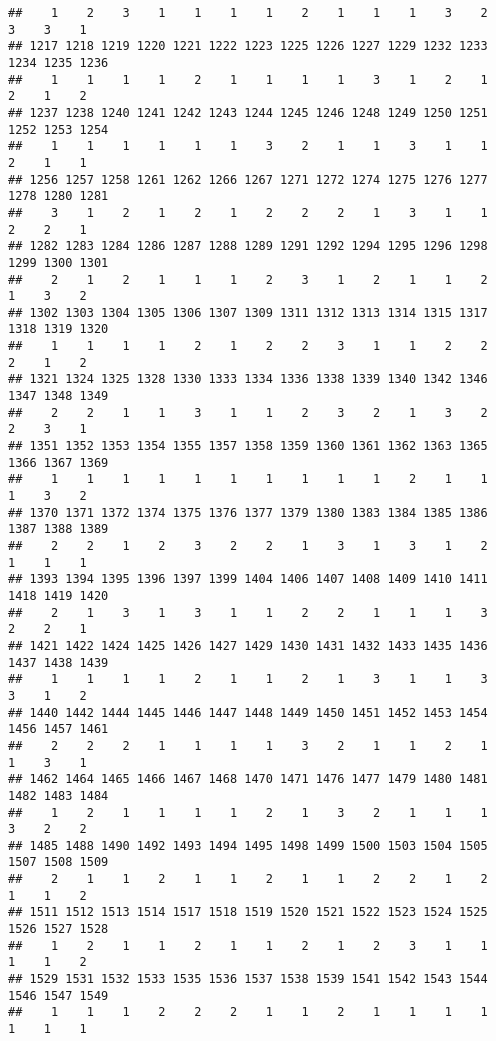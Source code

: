 \documentclass[
]{article}
\begin{document}
\begin{verbatim}
##    1    2    3    1    1    1    1    2    1    1    1    3    2    3    3    1 
## 1217 1218 1219 1220 1221 1222 1223 1225 1226 1227 1229 1232 1233 1234 1235 1236 
##    1    1    1    1    2    1    1    1    1    3    1    2    1    2    1    2 
## 1237 1238 1240 1241 1242 1243 1244 1245 1246 1248 1249 1250 1251 1252 1253 1254 
##    1    1    1    1    1    1    3    2    1    1    3    1    1    2    1    1 
## 1256 1257 1258 1261 1262 1266 1267 1271 1272 1274 1275 1276 1277 1278 1280 1281 
##    3    1    2    1    2    1    2    2    2    1    3    1    1    2    2    1 
## 1282 1283 1284 1286 1287 1288 1289 1291 1292 1294 1295 1296 1298 1299 1300 1301 
##    2    1    2    1    1    1    2    3    1    2    1    1    2    1    3    2 
## 1302 1303 1304 1305 1306 1307 1309 1311 1312 1313 1314 1315 1317 1318 1319 1320 
##    1    1    1    1    2    1    2    2    3    1    1    2    2    2    1    2 
## 1321 1324 1325 1328 1330 1333 1334 1336 1338 1339 1340 1342 1346 1347 1348 1349 
##    2    2    1    1    3    1    1    2    3    2    1    3    2    2    3    1 
## 1351 1352 1353 1354 1355 1357 1358 1359 1360 1361 1362 1363 1365 1366 1367 1369 
##    1    1    1    1    1    1    1    1    1    1    2    1    1    1    3    2 
## 1370 1371 1372 1374 1375 1376 1377 1379 1380 1383 1384 1385 1386 1387 1388 1389 
##    2    2    1    2    3    2    2    1    3    1    3    1    2    1    1    1 
## 1393 1394 1395 1396 1397 1399 1404 1406 1407 1408 1409 1410 1411 1418 1419 1420 
##    2    1    3    1    3    1    1    2    2    1    1    1    3    2    2    1 
## 1421 1422 1424 1425 1426 1427 1429 1430 1431 1432 1433 1435 1436 1437 1438 1439 
##    1    1    1    1    2    1    1    2    1    3    1    1    3    3    1    2 
## 1440 1442 1444 1445 1446 1447 1448 1449 1450 1451 1452 1453 1454 1456 1457 1461 
##    2    2    2    1    1    1    1    3    2    1    1    2    1    1    3    1 
## 1462 1464 1465 1466 1467 1468 1470 1471 1476 1477 1479 1480 1481 1482 1483 1484 
##    1    2    1    1    1    1    2    1    3    2    1    1    1    3    2    2 
## 1485 1488 1490 1492 1493 1494 1495 1498 1499 1500 1503 1504 1505 1507 1508 1509 
##    2    1    1    2    1    1    2    1    1    2    2    1    2    1    1    2 
## 1511 1512 1513 1514 1517 1518 1519 1520 1521 1522 1523 1524 1525 1526 1527 1528 
##    1    2    1    1    2    1    1    2    1    2    3    1    1    1    1    2 
## 1529 1531 1532 1533 1535 1536 1537 1538 1539 1541 1542 1543 1544 1546 1547 1549 
##    1    1    1    2    2    2    1    1    2    1    1    1    1    1    1    1 

\end{verbatim}
\end{document}
